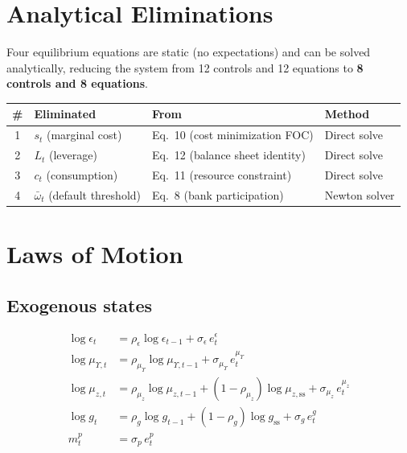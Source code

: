 \documentclass[11pt]{article}
\begin{document}
\section{Analytical Eliminations}
\label{sec:eliminations}

Four equilibrium equations are static (no expectations) and can be solved
analytically, reducing the system from 12 controls and 12 equations to
\textbf{8 controls and 8 equations}.

\begin{center}
\begin{tabular}{clll}
\toprule
\# & Eliminated & From & Method \\
\midrule
1 & $s_t$ (marginal cost) & Eq.~10 (cost minimization FOC) & Direct solve \\
2 & $L_t$ (leverage) & Eq.~12 (balance sheet identity) & Direct solve \\
3 & $c_t$ (consumption) & Eq.~11 (resource constraint) & Direct solve \\
4 & $\bar\omega_t$ (default threshold) & Eq.~8 (bank participation) & Newton solver \\
\bottomrule
\end{tabular}
\end{center}


\section{Laws of Motion}

\subsection{Exogenous states}
\begin{align*}
  \log\epsilon_t &= \rho_\epsilon \log\epsilon_{t-1} + \sigma_\epsilon\,e_t^\epsilon
  \\
  \log\mu_{\Upsilon,t} &= \rho_{\mu_\Upsilon} \log\mu_{\Upsilon,t-1}
    + \sigma_{\mu_\Upsilon}\,e_t^{\mu_\Upsilon}
  \\
  \log\mu_{z,t} &= \rho_{\mu_z} \log\mu_{z,t-1}
    + (1-\rho_{\mu_z})\log\mu_{z,\text{ss}}
    + \sigma_{\mu_z}\,e_t^{\mu_z}
  \\
  \log g_t &= \rho_g \log g_{t-1} + (1-\rho_g)\log g_{\text{ss}}
    + \sigma_g\,e_t^g
  \\
  m_t^p &= \sigma_p\,e_t^p
\end{align*}
\end{document}
